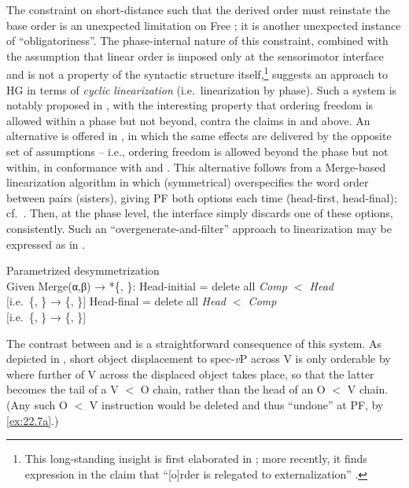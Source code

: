 \documentclass[output=paper]{langsci/langscibook}
\begin{document}
The constraint on short-distance  such that the derived order must
reinstate the base order is an unexpected limitation on Free ; it is
another unexpected instance of \enquote{obligatoriness}. The phase-internal nature of
this constraint, combined with the assumption that linear order is imposed only
at the sensorimotor interface and is not a property of the syntactic structure
itself,\footnote{This long-standing insight is first elaborated in
    \textcite[334--340]{Chomsky1995}; more recently, it finds expression in the
    claim that \enquote{[o]rder is relegated to externalization}
\citep[4]{Chomsky2015}.} suggests an approach to \gls{HG} in terms of \emph{cyclic}
\emph{linearization} (i.e.\ linearization by phase). Such a system is notably
proposed in \citet{FoxPes2005}, with the interesting property that
ordering freedom is allowed within a phase but not beyond, contra the claims in
 and  above. An alternative is offered in
\textcite{Richards2004,Richards2007b}, in which the same effects are delivered
by the opposite set of assumptions -- i.e., ordering freedom is allowed beyond
the phase but not within, in conformance with  and
. This alternative follows from a Merge-based linearization
algorithm in which (symmetrical)  overspecifies the word order
between  pairs (sisters), giving \gls{PF} both options each time
(head-first, head-final); cf.\ \citealt{EpsGroKawKit1998}.  Then, at the
phase level, the interface simply discards one of these options,
consistently. Such an \enquote{overgenerate-and-filter} approach to
linearization may be expressed as in .

\ea\label{ex:22.7}Parametrized desymmetrization\\
    Given Merge(α,β) → *\{, \}:
    \ea\label{ex:22.7a} Head-initial = delete all \emph{Comp $<$ Head}\\
    {}[i.e.\ \{, \} → \{, \sout{}\}]
    \ex\label{ex:22.7b} Head-final = delete all \emph{Head $<$ Comp}\\
    {}[i.e.\ \{, \} → \{\sout{}, \}]
    \z
\z

The contrast between  and  is a
straightforward consequence of this system. As depicted in ,
short object displacement to spec-\emph{v}P across V is only orderable by
 where further  of V across the displaced object
takes place, so that the latter becomes the tail of a V $<$ O chain, rather
than the head of an O $<$ V chain. (Any such O $<$ V instruction would be
deleted and thus \enquote{undone} at \gls{PF}, by
\ref{ex:22.7a}.)
\end{document}
